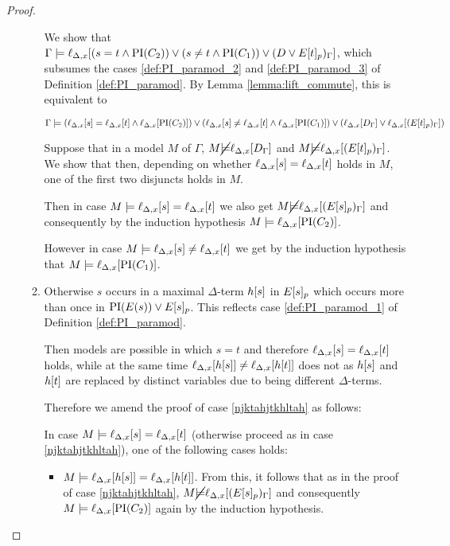 \begin{proof}
\begin{itemize}
\begin{enumerate}
					We show that $\Gamma \entails \lif{ (s=t \land \PI(C_2)) \lor (s\neq t \land \PI(C_1)) \lor (D \lor E\occurat{t}{p})_\Gamma}$, which subsumes the cases \ref{def:PI_paramod_2} and \ref{def:PI_paramod_3} of 
					Definition \ref{def:PI_paramod}. By Lemma \ref{lemma:lift_commute}, this is equivalent to

					$\Gamma \entails (\lif{s}=\lif{t} \land \lif{\PI(C_2)}) \lor (\lif s\neq \lif t \land \lif{\PI(C_1)}) \lor (\lif{D_\Gamma} \lor \lif{(E\occurat{t}{p})_\Gamma})$

					Suppose that in a model $M$ of $\Gamma$,
					$M \cancel\entails \lift{\Delta}{ D_\Gamma }{x}$ and 
					$M \cancel\entails \lift{\Delta}{ (E\occurat{t}{p})_\Gamma }{x}$.
					We show that then, depending on whether $\lif{s} = \lif{t}$ holds in $M$, one of the first two disjuncts holds in $M$.

					Then in case $M \entails \lif{s} = \lif{t}$ we also get
					$M \cancel\entails \lift{\Delta}{ (E\occurat{s}{p})_\Gamma }{x}$ and consequently by the induction hypothesis $M\entails \lif{\PI(C_2)}$.

					However in case $M \entails \lif{s} \neq \lif{t}$ we get by the induction hypothesis that 
					$M\entails \lif{\PI(C_1)}$.

					\label{njktahjtkhltah}

				\item Otherwise $s$ occurs in a maximal $\Delta$-term $h\occur{s}$ in $E\occurat{s}{p}$ which occurs more than once in $\PI(E(s)) \lor E\occurat{s}{p}$.
				This reflects case \ref{def:PI_paramod_1} of Definition \ref{def:PI_paramod}.

					Then models are possible in which $s=t$ and therefore $\lif{s}=\lif{t}$ holds, while at the same time $\lif{h\occur{s}} \neq \lif{h\occur{t}}$ does not as $h\occur{s}$ and $h\occur{t}$ are replaced by distinct variables due to being different $\Delta$-terms.

					Therefore we amend the proof of case \ref{njktahjtkhltah} as follows:

					In case $M \entails \lif{s} = \lif{t}$ (otherwise proceed as in case \ref{njktahjtkhltah}), 
					one of the following cases holds:

					\begin{itemize}
					\item $M\entails \lif{h\occur{s}} = \lif{h\occur{t}}$. From this, it follows that as in the proof of case \ref{njktahjtkhltah}, $M \cancel \entails \lif{(E\occurat{s}{p})_\Gamma}$ and consequently $M \entails \lif{\PI(C_2)}$ again by the induction hypothesis.


\end{itemize}
\end{enumerate}
\end{itemize}
\end{proof}

